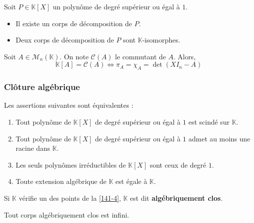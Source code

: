   \begin{theorem}
    Soit $P \in \mathbb{K}[X]$ un polynôme de degré supérieur ou égal à $1$.
    \begin{itemize}
      \item Il existe un corps de décomposition de $P$.
      \item Deux corps de décomposition de $P$ sont $\mathbb{K}$-isomorphes.
    \end{itemize}
  \end{theorem}


  \begin{application}
    Soit $A \in \mathcal{M}_n(\mathbb{K})$. On note $\mathcal{C}(A)$ le commutant de $A$. Alors,
    \[ \mathbb{K}[A] = \mathcal{C}(A) \iff \pi_A = \chi_A = \det(XI_n - A) \]
  \end{application}

  \subsubsection{Clôture algébrique}


  \begin{proposition}
    \label{141-4}
    Les assertions suivantes sont équivalentes :
    \begin{enumerate}[label={\bfseries(\roman*)}]
      \item Tout polynôme de $\mathbb{K}[X]$ de degré supérieur ou égal à $1$ est scindé sur $\mathbb{K}$.
      \item Tout polynôme de $\mathbb{K}[X]$ de degré supérieur ou égal à $1$ admet au moins une racine dans $\mathbb{K}$.
      \item Les seuls polynômes irréductibles de $\mathbb{K}[X]$ sont ceux de degré $1$.
      \item Toute extension algébrique de $\mathbb{K}$ est égale à $\mathbb{K}$.
    \end{enumerate}
  \end{proposition}

  \begin{definition}
    Si $\mathbb{K}$ vérifie un des points de la \cref{141-4}, $\mathbb{K}$ est dit \textbf{algébriquement clos}.
  \end{definition}

  \begin{proposition}
    Tout corps algébriquement clos est infini.
  \end{proposition}

